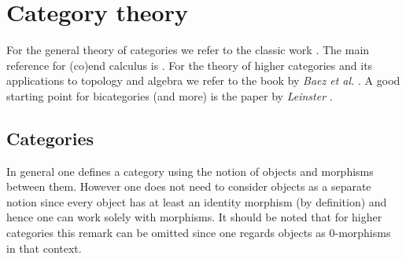 \chapter{Category theory}\label{chapter:cat}

    For the general theory of categories we refer to the classic work \cite{maclane}. The main reference for (co)end calculus is \cite{end}. For the theory of higher categories and its applications to topology and algebra we refer to the book by \textit{Baez et al.} \cite{towards_higher_cat}. A good starting point for bicategories (and more) is the paper by \textit{Leinster} \cite{basic_bicategories}.

\section{Categories}

    \begin{remark}
        In general one defines a category using the notion of objects and morphisms between them. However one does not need to consider objects as a separate notion since every object has at least an identity morphism (by definition) and hence one can work solely with morphisms. It should be noted that for higher categories this remark can be omitted since one regards objects as 0-morphisms in that context.
    \end{remark}


